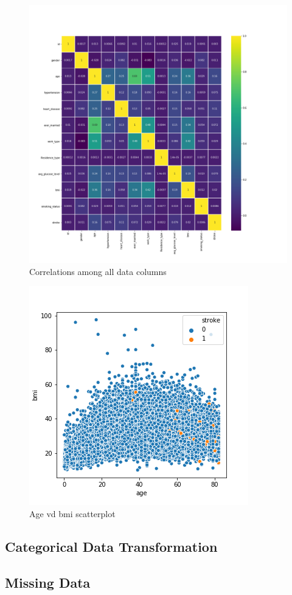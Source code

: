 \documentclass[proposal]{softeng}
\begin{document}
\begin{figure}[h!]
\centering
  \includegraphics[scale=0.3]{images/building_ann/heatmap.png}
  \caption{Correlations among all data columns}
  \label{fig:heatmap}
\end{figure}
\begin{figure}[h!]
\centering
  \includegraphics[scale=0.3]{images/building_ann/age_bmi_scatterplot.png}
  \caption{Age vd bmi scatterplot}
  \label{fig:age_bmi_scatterplot}
\end{figure}

\subsection{Categorical Data Transformation}
\subsection{Missing Data}


















\newpage
\footnotesize




\clearpage
\end{document}
